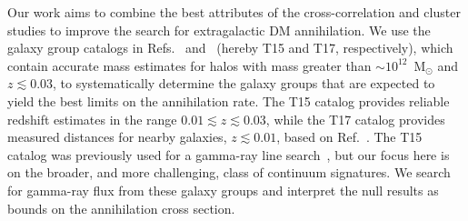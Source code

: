  Our work aims to combine the best attributes of the cross-correlation and cluster studies to improve the search for extragalactic DM annihilation.  We use the galaxy group catalogs in Refs.~\cite{Tully:2015opa} and~\cite{2017ApJ...843...16K} (hereby T15 and T17, respectively), which contain accurate mass estimates for halos with mass greater than $\sim$$10^{12}$~M$_\odot$ and $z \lesssim 0.03$, to systematically determine the galaxy groups that are expected to yield the best limits on the annihilation rate.  The T15 catalog provides reliable redshift estimates in the range $0.01 \lesssim z \lesssim 0.03$, while the T17 catalog provides measured distances for nearby galaxies, $z \lesssim 0.01$, based on Ref.~\cite{Tully:2016ppz}. The T15 catalog was previously used for a gamma-ray line search~\cite{Adams:2016alz}, but our focus here is on the broader, and more challenging, class of continuum signatures.  We search for gamma-ray flux from these galaxy groups and interpret the null results as bounds on the annihilation cross section.   
 
